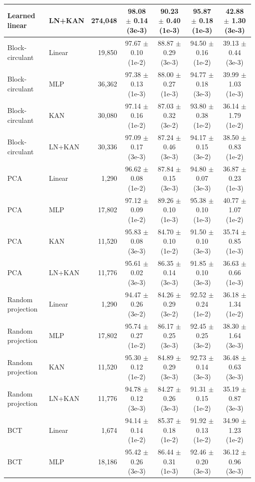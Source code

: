 \documentclass[10pt]{article}
\begin{document}
\begin{longtable}{llrcccc}
Learned linear & LN+KAN & 274,048 & 98.08 $\pm$ 0.14 (3e-3) & 90.23 $\pm$ 0.40 (1e-3) & 95.87 $\pm$ 0.18 (1e-3) & 42.88 $\pm$ 1.30 (3e-3) \\
\midrule
Block-circulant & Linear & 19,850 & 97.67 $\pm$ 0.10 (1e-2) & 88.87 $\pm$ 0.29 (3e-3) & 94.50 $\pm$ 0.16 (1e-2) & 39.13 $\pm$ 0.44 (3e-3) \\
Block-circulant & MLP & 36,362 & 97.38 $\pm$ 0.13 (1e-3) & 88.00 $\pm$ 0.27 (1e-3) & 94.77 $\pm$ 0.18 (3e-3) & 39.99 $\pm$ 1.03 (1e-3) \\
Block-circulant & KAN & 30,080 & 97.14 $\pm$ 0.16 (1e-2) & 87.03 $\pm$ 0.32 (3e-2) & 93.80 $\pm$ 0.38 (1e-2) & 36.14 $\pm$ 1.79 (1e-2) \\
Block-circulant & LN+KAN & 30,336 & 97.09 $\pm$ 0.17 (3e-3) & 87.24 $\pm$ 0.46 (3e-3) & 94.17 $\pm$ 0.15 (3e-2) & 38.50 $\pm$ 0.83 (1e-2) \\
\midrule
PCA & Linear & 1,290 & 96.62 $\pm$ 0.08 (1e-2) & 87.84 $\pm$ 0.15 (3e-3) & 94.80 $\pm$ 0.07 (3e-3) & 36.87 $\pm$ 0.23 (1e-3) \\
PCA & MLP & 17,802 & 97.12 $\pm$ 0.09 (1e-2) & 89.26 $\pm$ 0.10 (1e-3) & 95.38 $\pm$ 0.10 (1e-3) & 40.77 $\pm$ 1.07 (1e-2) \\
PCA & KAN & 11,520 & 95.83 $\pm$ 0.08 (3e-3) & 84.70 $\pm$ 0.10 (1e-2) & 91.50 $\pm$ 0.10 (3e-3) & 35.74 $\pm$ 0.85 (1e-3) \\
PCA & LN+KAN & 11,776 & 95.61 $\pm$ 0.02 (3e-3) & 86.35 $\pm$ 0.14 (3e-3) & 91.85 $\pm$ 0.10 (3e-3) & 36.63 $\pm$ 0.66 (1e-3) \\
\midrule
Random projection & Linear & 1,290 & 94.47 $\pm$ 0.26 (3e-2) & 84.26 $\pm$ 0.29 (3e-2) & 92.52 $\pm$ 0.24 (1e-2) & 36.18 $\pm$ 1.34 (1e-2) \\
Random projection & MLP & 17,802 & 95.74 $\pm$ 0.27 (1e-2) & 86.17 $\pm$ 0.25 (3e-3) & 92.45 $\pm$ 0.25 (3e-2) & 38.30 $\pm$ 1.64 (3e-3) \\
Random projection & KAN & 11,520 & 95.30 $\pm$ 0.12 (1e-2) & 84.89 $\pm$ 0.29 (3e-3) & 92.73 $\pm$ 0.14 (3e-3) & 36.48 $\pm$ 0.63 (3e-3) \\
Random projection & LN+KAN & 11,776 & 94.78 $\pm$ 0.12 (3e-3) & 84.27 $\pm$ 0.26 (3e-3) & 91.31 $\pm$ 0.15 (1e-2) & 35.19 $\pm$ 0.87 (3e-3) \\
\midrule
BCT & Linear & 1,674 & 94.14 $\pm$ 0.14 (1e-2) & 85.37 $\pm$ 0.18 (1e-2) & 91.92 $\pm$ 0.13 (1e-2) & 34.90 $\pm$ 1.23 (1e-2) \\
BCT & MLP & 18,186 & 95.42 $\pm$ 0.26 (3e-3) & 86.44 $\pm$ 0.31 (1e-3) & 92.46 $\pm$ 0.20 (3e-3) & 36.12 $\pm$ 0.96 (3e-3) \\

\end{longtable}
\end{document}
